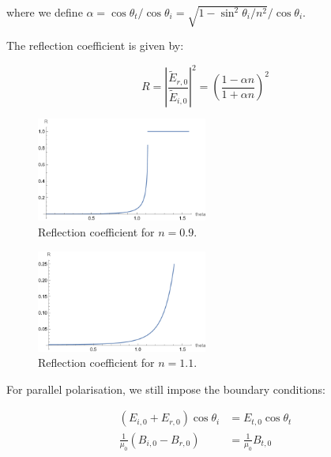 \documentclass[12pt]{article}
\begin{document}
where we define $\alpha = \cos{\theta_{t}}/\cos{\theta_{i}} = \sqrt{1 - \sin^{2}{\theta_{i}}/n^{2}}/\cos{\theta_{i}}$.

The reflection coefficient is given by:

\begin{equation}
    R = \left\lvert \frac{\tilde{E}_{r, 0}}{\tilde{E}_{i, 0}} \right\rvert^{2} = \left( \frac{1 - \alpha n}{1 + \alpha n} \right)^{2}
\end{equation}

\begin{figure}[ht]
    \centering
    \includegraphics[width=0.5\textwidth]{../plots/electro_3_3_a.png}
    \caption{Reflection coefficient for $n = 0.9$.}
    \label{fig:reflection_coefficient_1}
\end{figure}

\begin{figure}[ht]
    \centering
    \includegraphics[width=0.5\textwidth]{../plots/electro_3_3_b.png}
    \caption{Reflection coefficient for $n = 1.1$.}
    \label{fig:reflection_coefficient_2}
\end{figure}

For parallel polarisation, we still impose the boundary conditions:

\begin{equation}
\begin{split}
    (E_{i, 0} + E_{r, 0}) \cos{\theta_{i}} &= E_{t, 0} \cos{\theta_{t}} \\
    \frac{1}{\mu_{0}} (B_{i, 0} - B_{r, 0}) &= \frac{1}{\mu_{0}} B_{t, 0}
\end{split}
\end{equation}
\end{document}
